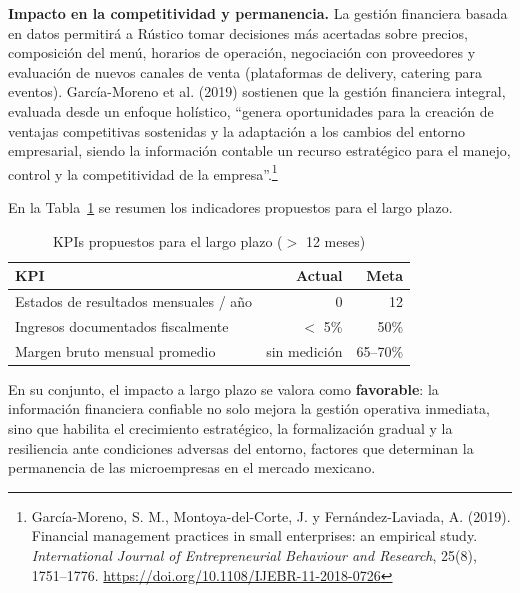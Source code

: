 \documentclass[12pt,letterpaper]{article}
\begin{document}
\textbf{Impacto en la competitividad y permanencia.} La gestión financiera basada en datos permitirá a Rústico tomar decisiones más acertadas sobre precios, composición del menú, horarios de operación, negociación con proveedores y evaluación de nuevos canales de venta (plataformas de delivery, catering para eventos). García-Moreno et al. (2019) sostienen que la gestión financiera integral, evaluada desde un enfoque holístico, ``genera oportunidades para la creación de ventajas competitivas sostenidas y la adaptación a los cambios del entorno empresarial, siendo la información contable un recurso estratégico para el manejo, control y la competitividad de la empresa''.\footnote{García-Moreno, S. M., Montoya-del-Corte, J. y Fernández-Laviada, A. (2019). Financial management practices in small enterprises: an empirical study. \textit{International Journal of Entrepreneurial Behaviour and Research}, 25(8), 1751--1776. \url{https://doi.org/10.1108/IJEBR-11-2018-0726}}

En la Tabla~\ref{tab:kpis_largo} se resumen los indicadores propuestos para el largo plazo.

\begin{table}[ht]
\centering
\caption{KPIs propuestos para el largo plazo ($>$ 12 meses)}
\label{tab:kpis_largo}
\begin{tabular}{l r r}
\toprule
\textbf{KPI} & \textbf{Actual} & \textbf{Meta} \\
\midrule
Estados de resultados mensuales / año & 0 & 12 \\
Ingresos documentados fiscalmente & $<$ 5\% & 50\% \\
Margen bruto mensual promedio & sin medición & 65--70\% \\
\bottomrule
\end{tabular}
\end{table}

En su conjunto, el impacto a largo plazo se valora como \textbf{favorable}: la información financiera confiable no solo mejora la gestión operativa inmediata, sino que habilita el crecimiento estratégico, la formalización gradual y la resiliencia ante condiciones adversas del entorno, factores que determinan la permanencia de las microempresas en el mercado mexicano.
\end{document}
